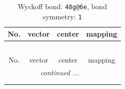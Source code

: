 \documentclass[fleqn,8pt]{jsarticle}
\begin{document}
\renewcommand{\arraystretch}{1.2}
\begin{longtable}{cccc}
\caption{Wyckoff bond: {\tt 48g@6e}, bond symmetry: {\tt 1}}
 \\
 \hline \hline
No. & vector & center & mapping \\ \hline \endfirsthead

\multicolumn{3}{l}{\tablename\ \thetable{}} \\
 \hline \hline
No. & vector & center & mapping \\ \hline \endhead

 \hline \hline
\multicolumn{3}{r}{\footnotesize\it continued ...} \\ \endfoot

 \hline \hline
\multicolumn{3}{r}{} \\ \endlastfoot


\end{longtable}
\end{document}
